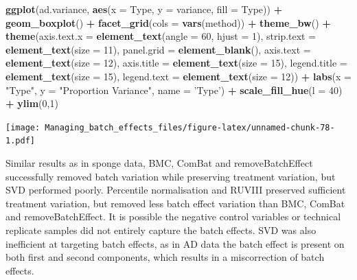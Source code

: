 \documentclass[]{book}
\newenvironment{Shaded}{\begin{snugshade}}{\end{snugshade}}
\newcommand{\KeywordTok}[1]{\textcolor[rgb]{0.13,0.29,0.53}{\textbf{#1}}}
\newcommand{\DataTypeTok}[1]{\textcolor[rgb]{0.13,0.29,0.53}{#1}}
\newcommand{\DecValTok}[1]{\textcolor[rgb]{0.00,0.00,0.81}{#1}}
\newcommand{\StringTok}[1]{\textcolor[rgb]{0.31,0.60,0.02}{#1}}
\newcommand{\OperatorTok}[1]{\textcolor[rgb]{0.81,0.36,0.00}{\textbf{#1}}}
\newcommand{\NormalTok}[1]{#1}
\begin{document}
\begin{Shaded}
\begin{Highlighting}[]
\KeywordTok{ggplot}\NormalTok{(ad.variance, }\KeywordTok{aes}\NormalTok{(}\DataTypeTok{x =}\NormalTok{ Type, }\DataTypeTok{y =}\NormalTok{ variance, }\DataTypeTok{fill =}\NormalTok{ Type)) }\OperatorTok{+}\StringTok{ }
\StringTok{  }\KeywordTok{geom_boxplot}\NormalTok{() }\OperatorTok{+}\StringTok{ }\KeywordTok{facet_grid}\NormalTok{(}\DataTypeTok{cols =} \KeywordTok{vars}\NormalTok{(method)) }\OperatorTok{+}\StringTok{ }\KeywordTok{theme_bw}\NormalTok{() }\OperatorTok{+}\StringTok{ }
\StringTok{  }\KeywordTok{theme}\NormalTok{(}\DataTypeTok{axis.text.x =} \KeywordTok{element_text}\NormalTok{(}\DataTypeTok{angle =} \DecValTok{60}\NormalTok{, }\DataTypeTok{hjust =} \DecValTok{1}\NormalTok{), }
        \DataTypeTok{strip.text =} \KeywordTok{element_text}\NormalTok{(}\DataTypeTok{size =} \DecValTok{11}\NormalTok{), }\DataTypeTok{panel.grid =} \KeywordTok{element_blank}\NormalTok{(), }
        \DataTypeTok{axis.text =} \KeywordTok{element_text}\NormalTok{(}\DataTypeTok{size =} \DecValTok{12}\NormalTok{), }\DataTypeTok{axis.title =} \KeywordTok{element_text}\NormalTok{(}\DataTypeTok{size =} \DecValTok{15}\NormalTok{),}
        \DataTypeTok{legend.title =} \KeywordTok{element_text}\NormalTok{(}\DataTypeTok{size =} \DecValTok{15}\NormalTok{), }\DataTypeTok{legend.text =} \KeywordTok{element_text}\NormalTok{(}\DataTypeTok{size =} \DecValTok{12}\NormalTok{)) }\OperatorTok{+}\StringTok{ }
\StringTok{  }\KeywordTok{labs}\NormalTok{(}\DataTypeTok{x =} \StringTok{"Type"}\NormalTok{, }\DataTypeTok{y =} \StringTok{"Proportion Variance"}\NormalTok{, }\DataTypeTok{name =} \StringTok{'Type'}\NormalTok{) }\OperatorTok{+}\StringTok{ }
\StringTok{  }\KeywordTok{scale_fill_hue}\NormalTok{(}\DataTypeTok{l =} \DecValTok{40}\NormalTok{) }\OperatorTok{+}\StringTok{ }\KeywordTok{ylim}\NormalTok{(}\DecValTok{0}\NormalTok{,}\DecValTok{1}\NormalTok{)}
\end{Highlighting}
\end{Shaded}

\texttt{[image: Managing\_batch\_effects\_files/figure-latex/unnamed-chunk-78-1.pdf]}

Similar results as in sponge data, BMC, ComBat and removeBatchEffect
successfully removed batch variation while preserving treatment
variation, but SVD performed poorly. Percentile normalisation and RUVIII
preserved sufficient treatment variation, but removed less batch effect
variation than BMC, ComBat and removeBatchEffect. It is possible the
negative control variables or technical replicate samples did not
entirely capture the batch effects. SVD was also inefficient at
targeting batch effects, as in AD data the batch effect is present on
both first and second components, which results in a miscorrection of
batch effects.
\end{document}
